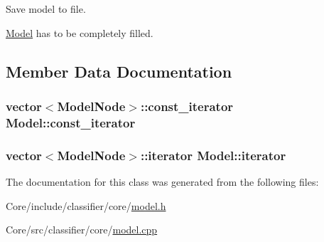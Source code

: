 Save model to file. 

\hyperlink{classModel}{Model} has to be completely filled. 

\subsection{Member Data Documentation}
\hypertarget{classModel_a578f203623cdda48b577f10a8d6e12d4}{
\subsubsection[{const\+\_\+iterator}]{\setlength{\rightskip}{0pt plus 5cm}vector$<$Model\+Node$>$\+::const\+\_\+iterator Model\+::const\+\_\+iterator}}\label{classModel_a578f203623cdda48b577f10a8d6e12d4}
\hypertarget{classModel_a0cfbe847990e80cb9033e8a3257bced2}{
\subsubsection[{iterator}]{\setlength{\rightskip}{0pt plus 5cm}vector$<$Model\+Node$>$\+::iterator Model\+::iterator}}\label{classModel_a0cfbe847990e80cb9033e8a3257bced2}


The documentation for this class was generated from the following files\+:\begin{DoxyCompactItemize}
\item 
Core/include/classifier/core/\hyperlink{model_8h}{model.\+h}\item 
Core/src/classifier/core/\hyperlink{model_8cpp}{model.\+cpp}\end{DoxyCompactItemize}

